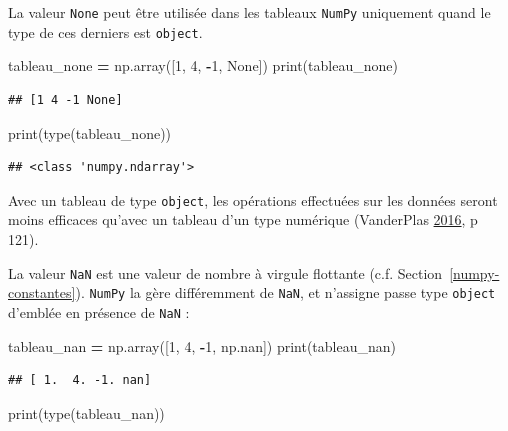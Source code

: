 \documentclass[12pt,]{book}
\newenvironment{Shaded}{\begin{snugshade}}{\end{snugshade}}
\newcommand{\DecValTok}[1]{\textcolor[rgb]{0.00,0.00,0.81}{#1}}
\newcommand{\VariableTok}[1]{\textcolor[rgb]{0.00,0.00,0.00}{#1}}
\newcommand{\OperatorTok}[1]{\textcolor[rgb]{0.81,0.36,0.00}{\textbf{#1}}}
\newcommand{\BuiltInTok}[1]{#1}
\newcommand{\NormalTok}[1]{#1}
\numberwithin{equation}{section}
\numberwithin{countremarque}{section}
\begin{document}
La valeur \texttt{None} peut être utilisée dans les tableaux
\texttt{NumPy} uniquement quand le type de ces derniers est
\texttt{object}.

\begin{Shaded}
\begin{Highlighting}[]
\NormalTok{tableau_none }\OperatorTok{=}\NormalTok{ np.array([}\DecValTok{1}\NormalTok{, }\DecValTok{4}\NormalTok{, }\OperatorTok{-}\DecValTok{1}\NormalTok{, }\VariableTok{None}\NormalTok{])}
\BuiltInTok{print}\NormalTok{(tableau_none)}
\end{Highlighting}
\end{Shaded}

\begin{lstlisting}
## [1 4 -1 None]
\end{lstlisting}

\begin{Shaded}
\begin{Highlighting}[]
\BuiltInTok{print}\NormalTok{(}\BuiltInTok{type}\NormalTok{(tableau_none))}
\end{Highlighting}
\end{Shaded}

\begin{lstlisting}
## <class 'numpy.ndarray'>
\end{lstlisting}

Avec un tableau de type \texttt{object}, les opérations effectuées sur
les données seront moins efficaces qu'avec un tableau d'un type
numérique (VanderPlas
\protect\hyperlink{ref-vanderplas2016python}{2016}, p 121).

La valeur \texttt{NaN} est une valeur de nombre à virgule flottante
(c.f. Section~\ref{numpy-constantes}). \texttt{NumPy} la gère
différemment de \texttt{NaN}, et n'assigne passe type \texttt{object}
d'emblée en présence de \texttt{NaN} :

\begin{Shaded}
\begin{Highlighting}[]
\NormalTok{tableau_nan }\OperatorTok{=}\NormalTok{ np.array([}\DecValTok{1}\NormalTok{, }\DecValTok{4}\NormalTok{, }\OperatorTok{-}\DecValTok{1}\NormalTok{, np.nan])}
\BuiltInTok{print}\NormalTok{(tableau_nan)}
\end{Highlighting}
\end{Shaded}

\begin{lstlisting}
## [ 1.  4. -1. nan]
\end{lstlisting}

\begin{Shaded}
\begin{Highlighting}[]
\BuiltInTok{print}\NormalTok{(}\BuiltInTok{type}\NormalTok{(tableau_nan))}
\end{Highlighting}
\end{Shaded}
\end{document}
